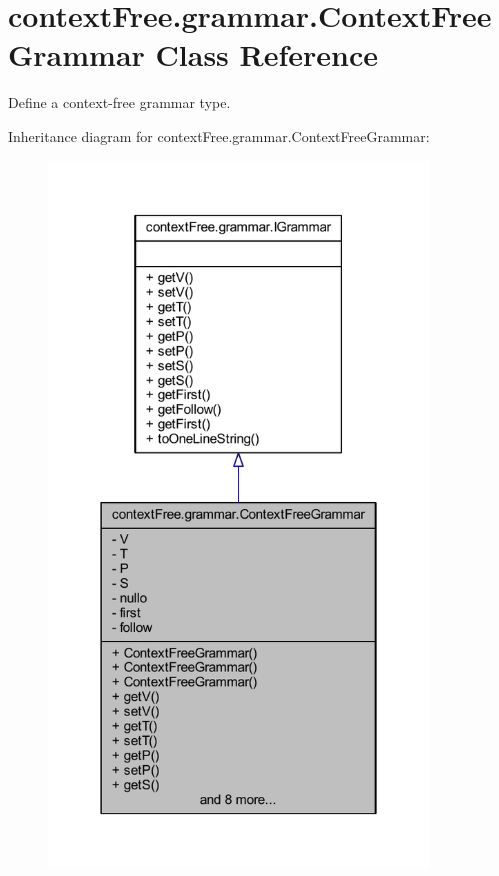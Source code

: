 \hypertarget{classcontext_free_1_1grammar_1_1_context_free_grammar}{\section{context\-Free.\-grammar.\-Context\-Free\-Grammar Class Reference}
\label{classcontext_free_1_1grammar_1_1_context_free_grammar}
}


Define a context-\/free grammar type.  




Inheritance diagram for context\-Free.\-grammar.\-Context\-Free\-Grammar\-:
\nopagebreak
\begin{figure}[H]
\begin{center}
\leavevmode
\includegraphics[width=286pt]{classcontext_free_1_1grammar_1_1_context_free_grammar__inherit__graph}
\end{center}
\end{figure}



